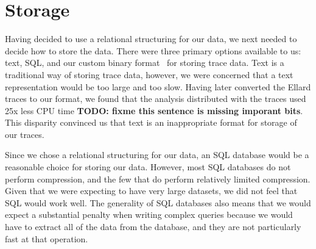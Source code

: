 \section{Storage}
\label{sec:storage}

Having decided to use a relational structuring for our data, we next
needed to decide how to store the data.  There were three primary
options available to us: text, SQL, and our custom binary
format~\cite{DSTechnicalReportSnapshot} for storing trace data.  Text
is a traditional way of storing trace data, however, we were concerned
that a text representation would be too large and too slow.  Having
later converted the Ellard traces to our format, we found that the
analysis distributed with the traces used 25x less CPU time {\bf TODO:
fixme this sentence is missing imporant bits}.  This disparity
convinced us that text is an inappropriate format for storage of our
traces.


Since we chose a relational structuring for our data, an SQL database
would be a reasonable choice for storing our data.  However, most SQL
databases do not perform compression, and the few that do perform
relatively limited compression. Given that we were expecting to have
very large datasets, we did not feel that SQL would work well.  The
generality of SQL databases also means that we would expect a
substantial penalty when writing complex queries because we would have
to extract all of the data from the database, and they are not
particularly fast at that operation.


